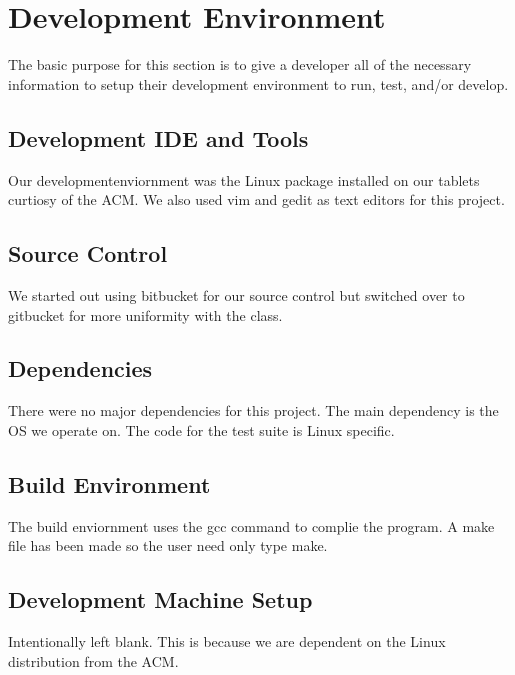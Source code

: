\chapter{Development Environment}
The basic purpose for this section is to give a developer all of the necessary 
information to setup their development environment to run, test, and/or develop. 


\section{Development IDE and Tools}
Our developmentenviornment was the  Linux package installed on our tablets curtiosy of the ACM. We also used vim and gedit as text editors for this project.

\section{Source  Control}
We started out using bitbucket for our source control but switched over to gitbucket for more uniformity with the class. 

\section{Dependencies}
There were no major dependencies for this project. The main dependency is the OS we operate on. The code for the test suite is Linux specific.

\section{Build  Environment}
The build enviornment uses the gcc command to complie the program. A make file has been made so the user need only type make.

\section{Development Machine Setup}
Intentionally left blank. This is because we are dependent on the Linux distribution from the ACM. 


